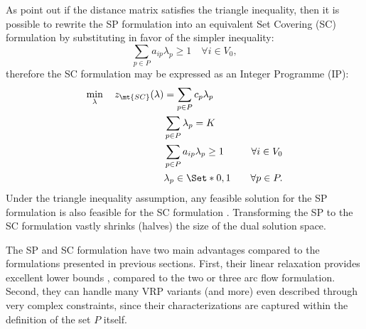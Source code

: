 As \textcite{toth2002} point out if the distance matrix satisfies the triangle inequality,
then it is possible to rewrite the SP formulation into an equivalent Set Covering (SC) formulation
by substituting 
in favor of the simpler inequality:
\begin{equation}\label{eq:set-covering-customers-visited-by-exactly-one-route}
	\sum_{p \in P}  a_{ip} \lambda_p \ge 1  \quad \forall i \in V_0,
\end{equation}
therefore the SC formulation may be expressed as an Integer Programme (IP):
\begin{align}
	\min_{\lambda} \quad z_\mt{SC}(\lambda) & = \sum_{p \in P}  c_p \lambda_p              & \label{eq:set-covering-obj-func}                                                       \\
	                                        & \sum_{p \in P} \lambda_{p} = K               & \label{eq:set-covering-K-routes}                                                       \\
	                                        & \sum_{p \in P}  a_{ip} \lambda_p \ge 1       & \quad \forall i \in V_0 \label{eq:set-covering-customers-visited-by-exactly-one-route} \\
	                                        & \lambda_p                    \in \Set*{0, 1} & \quad \forall p \in P \label{eq:set-covering-lambda-mip-var-bounds}.
\end{align}
Under the triangle inequality assumption,
any feasible solution for the SP formulation
is also feasible for the SC formulation
.
Transforming the SP to the SC formulation vastly shrinks (halves) the size of the dual solution space.

\medskip

The SP and SC formulation have two main advantages compared to the formulations presented in previous sections.
First, their linear relaxation provides excellent lower bounds \parencite{bramel1997},
compared to the two or three arc flow formulation.
Second, they can handle many VRP variants (and more)
even described through very complex constraints,
since their characterizations are captured within the definition of the set $P$ itself.
